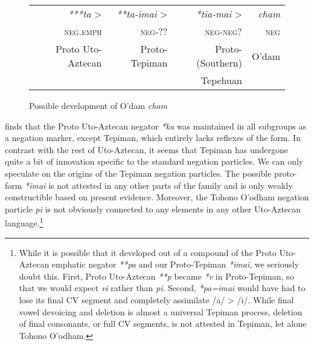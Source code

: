 \documentclass[output=paper,draft,draftmode,colorlinks,citecolor=brown]{langscibook}
\begin{document}
\begin{figure}[t]
\caption{Possible development of O'dam \emph{cham}}
\label{fig:odam-pathchange}

 \begin{tabular}{rrrr}
\emph{***ta} >	&	\emph{**ta-imai}	>	&	\emph{*tia-mai}	>	&	\emph{cham}\\
\textsc{neg.emph}	&	\textsc{neg}-??	&	\textsc{neg-neg?}	&	\textsc{neg}\\
Proto Uto-Aztecan	&	Proto-Tepiman	&	Proto-(Southern)	&		O’dam\\
& & Tepehuan & \\
\end{tabular}
\end{figure}

\citet{hill2014} finds that the Proto Uto-Aztecan negator \emph{*ka} was maintained in all subgroups as a negation marker, except Tepiman, which entirely lacks reflexes of the form. In contrast with the rest of Uto-Aztecan, it seems that Tepiman has undergone quite a bit of innovation specific to the standard negation particles. We can only speculate on the origins of the Tepiman negation particles. The possible proto-form \emph{*imai} is not attested in any other parts of the family and is only weakly constructible based on present evidence. Moreover, the Tohono O'odham negation particle \emph{pi} is not obviously connected to any  elements in any other Uto-Aztecan language.\footnote{While it is possible that it developed out of a compound of the Proto Uto-Aztecan emphatic negator \emph{**pa} and our Proto-Tepiman \emph{*imai}, we seriously doubt this. First, Proto Uto-Aztecan \emph{**p} became \emph{*v} in Proto-Tepiman, so that we would expect \emph{vi} rather than \emph{pi}. Second, \emph{*pa=imai} would have had to lose its final CV segment and completely assimilate /a/ > /i/. While final vowel devoicing and deletion is almost a universal Tepiman process, deletion of final consonants, or full CV segments, is not attested in Tepiman, let alone Tohono O'odham.} 
\end{document}
